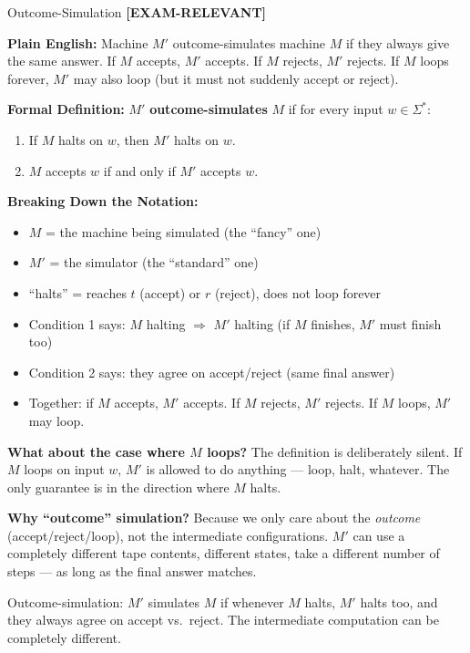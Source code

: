 \documentclass[11pt,a4paper]{article}
\newcommand{\kemark}{\textcolor{red!70!black}{\textbf{[EXAM-RELEVANT]}}}
\newcommand{\kt}[1]{\par\vspace{0.3em}\colorbox{yellow!60}{\parbox{\dimexpr\linewidth-2\fboxsep}{#1}}\vspace{0.3em}}
\begin{document}
\begin{definitionbox}{Outcome-Simulation \kemark}

\textbf{Plain English:}
Machine $M'$ outcome-simulates machine $M$ if they always give the same answer. If $M$ accepts, $M'$ accepts. If $M$ rejects, $M'$ rejects. If $M$ loops forever, $M'$ may also loop (but it must not suddenly accept or reject).

\textbf{Formal Definition:}
$M'$ \textbf{outcome-simulates} $M$ if for every input $w \in \Sigma^*$:
\begin{enumerate}[nosep]
\item If $M$ halts on $w$, then $M'$ halts on $w$.
\item $M$ accepts $w$ if and only if $M'$ accepts $w$.
\end{enumerate}

\textbf{Breaking Down the Notation:}
\begin{itemize}[nosep]
\item $M$ = the machine being simulated (the ``fancy'' one)
\item $M'$ = the simulator (the ``standard'' one)
\item ``halts'' = reaches $t$ (accept) or $r$ (reject), does not loop forever
\item Condition 1 says: $M$ halting $\Rightarrow$ $M'$ halting (if $M$ finishes, $M'$ must finish too)
\item Condition 2 says: they agree on accept/reject (same final answer)
\item Together: if $M$ accepts, $M'$ accepts. If $M$ rejects, $M'$ rejects. If $M$ loops, $M'$ may loop.
\end{itemize}

\textbf{What about the case where $M$ loops?}
The definition is deliberately silent. If $M$ loops on input $w$, $M'$ is allowed to do anything --- loop, halt, whatever. The only guarantee is in the direction where $M$ halts.

\textbf{Why ``outcome'' simulation?} Because we only care about the \textit{outcome} (accept/reject/loop), not the intermediate configurations. $M'$ can use a completely different tape contents, different states, take a different number of steps --- as long as the final answer matches.

\kt{Outcome-simulation: $M'$ simulates $M$ if whenever $M$ halts, $M'$ halts too, and they always agree on accept vs.\ reject. The intermediate computation can be completely different.}
\end{definitionbox}
\end{document}
